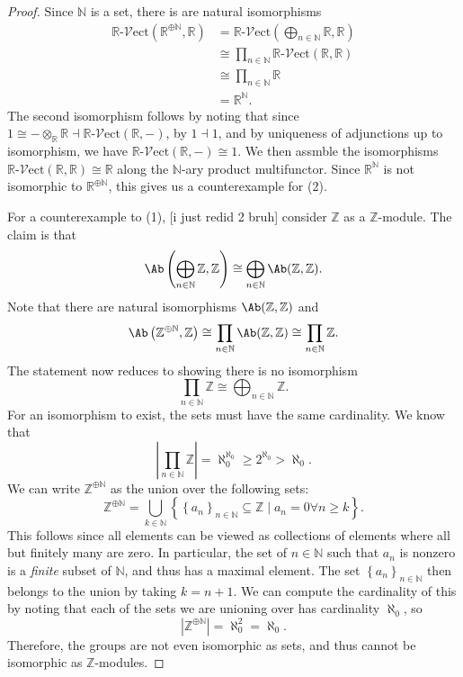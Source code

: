 \documentclass[11pt, letterpaper]{article}
\begin{document}
\begin{proof}
	Since $\mathbb{N} $ is a set, there is are natural isomorphisms
	\begin{align*}
		\mathbb{R} \text{-} \mathcal{V} \mathrm{ect} (\mathbb{R} ^{\oplus \mathbb{N} } ,\mathbb{R} )&=\mathbb{R} \text{-} \mathcal{V} \mathrm{ect} \left( \bigoplus_{n\in\mathbb{N} } \mathbb{R} ,\mathbb{R} \right) \\
													&\cong \prod_{n\in\mathbb{N} } \mathbb{R} \text{-} \mathcal{V} \mathrm{ect} (\mathbb{R} ,\mathbb{R} ) \\
													&\cong \prod_{n\in\mathbb{N} } \mathbb{R} \\
													&= \mathbb{R} ^\mathbb{N}
	.\end{align*}
The second isomorphism follows by noting that since $1\cong -\otimes _\mathbb{R} \mathbb{R} \dashv \mathbb{R} \text{-} \mathcal{V} \mathrm{ect}(\mathbb{R} ,-) $, by $1\dashv 1$, and by uniqueness of adjunctions up to isomorphism, we have $\mathbb{R} \text{-} \mathcal{V} \mathrm{ect} (\mathbb{R} ,-)\cong 1$. We then assmble the isomorphisms $\mathbb{R} \text{-} \mathcal{V} \mathrm{ect} (\mathbb{R} ,\mathbb{R} )\cong \mathbb{R} $ along the $\mathbb{N} $-ary product multifunctor. Since $\mathbb{R} ^\mathbb{N} $ is not isomorphic to $\mathbb{R} ^{\oplus \mathbb{N} } $, this gives us a counterexample for (2).

For a counterexample to (1), [i just redid 2 bruh] consider $\mathbb{Z} $ as a $\mathbb{Z} $-module. The claim is that
\[
	\Ab \left( \bigoplus_{n\in\mathbb{N} } \mathbb{Z} ,\mathbb{Z}  \right) \cong \bigoplus_{n\in\mathbb{N} } \Ab (\mathbb{Z} ,\mathbb{Z} )
.\]
Note that there are natural isomorphisms $\Ab (\mathbb{Z} ,\mathbb{Z} )$ and
\[
	\Ab \left( \mathbb{Z} ^{\oplus \mathbb{N} } ,\mathbb{Z}  \right) \cong \prod_{n\in\mathbb{N} } \Ab (\mathbb{Z} ,\mathbb{Z} )\cong \prod_{n\in\mathbb{N} } \mathbb{Z} 
.\]
The statement now reduces to showing there is no isomorphism
\[
	\prod_{n\in\mathbb{N} } \mathbb{Z}  \cong \bigoplus_{n\in\mathbb{N} } \mathbb{Z} 
.\]
For an isomorphism to exist, the sets must have the same cardinality. We know that
\[
	\left| \prod_{n\in\mathbb{N} } \mathbb{Z}  \right| =\aleph_0^{\aleph_0} \geq 2^{\aleph_0} >\aleph_0
.\]
We can write $\mathbb{Z} ^{\oplus \mathbb{N} } $ as the union over the following sets:
\[
	\mathbb{Z} ^{\oplus \mathbb{N} } =\bigcup_{k\in\mathbb{N} } \left\{ \left\{ a_n \right\}_{n\in\mathbb{N} } \subseteq \mathbb{Z} \mid a_n=0\forall n\geq k \right\} 
.\]
This follows since all elements can be viewed as collections of elements where all but finitely many are zero. In particular, the set of $n\in\mathbb{N}$ such that $a_n$ is nonzero is a \emph{finite} subset of $\mathbb{N} $, and thus has a maximal element. The set $\left\{ a_n \right\} _{n\in\mathbb{N} } $ then belongs to the union by taking $k=n+1$. We can compute the cardinality of this by noting that each of the sets we are unioning over has cardinality $\aleph_0$, so
\[
	\left| \mathbb{Z} ^{\oplus \mathbb{N} }  \right| =\aleph_0^2=\aleph_0
.\]
Therefore, the groups are not even isomorphic as sets, and thus cannot be isomorphic as $\mathbb{Z} $-modules.
\end{proof}
\end{document}
